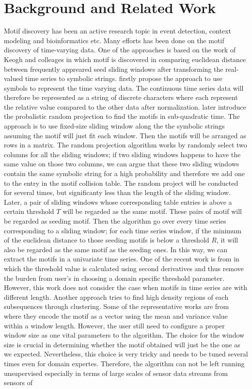 \documentclass{article}
\begin{document}
\section{Background and Related Work}
Motif discovery has been an active research topic in event detection, context modeling and bioinformatics etc. Many efforts has been done on the motif discovery of time-varying data. One of the approaches is based on the work of Keogh and colleages \cite{Lin03asymbolic} in which motif is discovered in comparing euclidean distance between frequently appreared seed sliding windows after transforming the real-valued time series to symbolic strings.\cite{Lin03asymbolic} firstly propose the approach to use symbols to represent the time varying data. The continuous time series data will therefore be represented as a string of discrete characters where each represent the relative value compared to the other data after normalization. \cite{Chiu03probabilisticdiscovery} later introduce the probalistic random projection to find the motifs in sub-quadratic time. The approach is to use fixed-size sliding window along the the symbolic strings assuming the motif will just fit each window. Then the motifs will be arranged as rows in a matrix. The random projection algorithm works by randomly select two columns for all the sliding windows; if two sliding windows happens to have the same value on those two columns, we can argue that these two sliding windows contain the same symbolic string for a high probability and therefore we add one to the entry in the motif collision table. The random project will be conducted for several times, but significanty less than the length of the sliding window. Later, a pair of sliding windows whose corresponding table entries is above a certain threshold $T$ will be regarded as the same motif. These pairs of motif will be regarded as seeding motif. Then the algorithm go over every time series corresponding to a sliding window; for each time series window, if the minimum of the euclidean distance to those seeding motifs is below a threshold $R$, it will also be regarded as the same motif as the seeding ones. In this way, we can extract the motifs in a univariate time series. One of the recent work is from \cite{Mueen09exactdiscovery} in which the threshold value is calculated using second derivatives and thus remove the burden from user's in choosing a domain specific threshold parameter. However, this work does not consider the case when motifs in time series are with different length. Another approach tries to find high density regions of each subsequences through clustering. Some of the representative works are from \cite{Minnen:2007:DMM:1619645.1619744} where they encode the motif as a vector using the mean and variance value within a window length. However, the user still need to configure a proper window size as one vital parameters to the algorithm. The choice for the window size is crucial in determining whether the motif obtained will just be the one as we expected. Nevertheless, this choice is very tricky and needs to be tuned several times even for domain expertes. Therefore, the algorithm can not be left running unsupervised especially in terms of large scales of sensor data streams from sensors of 
\end{document}
